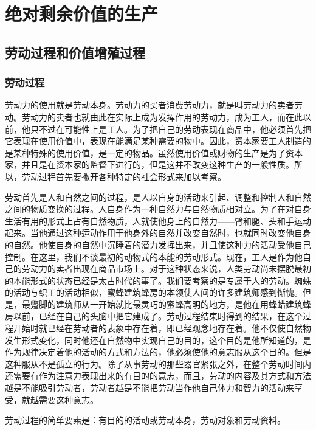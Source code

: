 \documentclass{ctexbook}
\begin{document}
\part{绝对剩余价值的生产}

\chapter{劳动过程和价值增殖过程}

    \section{劳动过程}

    
    劳动力的使用就是劳动本身。劳动力的买者消费劳动力，就是叫劳动力的卖者劳动。劳动力的卖者也就由此在实际上成为发挥作用的劳动力，成为工人，而在此以前，他只不过在可能性上是工人。为了把自己的劳动表现在商品中，他必须首先把它表现在使用价值中，表现在能满足某种需要的物中。因此，资本家要工人制造的是某种特殊的使用价值，是一定的物品。虽然使用价值或财物的生产是为了资本家，并且是在资本家的监督下进行的，但是这并不改变这种生产的一般性质。所以，劳动过程首先要撇开各种特定的社会形式来加以考察。

    劳动首先是人和自然之间的过程，是人以自身的活动来引起、调整和控制人和自然之间的物质变换的过程。人自身作为一种自然力与自然物质相对立。为了在对自身生活有用的形式上占有自然物质，人就使他身上的自然力——臂和腿、头和手运动起来。当他通过这种运动作用于他身外的自然并改变自然时，也就同时改变他自身的自然。他使自身的自然中沉睡着的潜力发挥出来，并且使这种力的活动受他自己控制。在这里，我们不谈最初的动物式的本能的劳动形式。现在，工人是作为他自己的劳动力的卖者出现在商品市场上。对于这种状态来说，人类劳动尚未摆脱最初的本能形式的状态已经是太古时代的事了。我们要考察的是专属于人的劳动。蜘蛛的活动与织工的活动相似，蜜蜂建筑蜂房的本领使人间的许多建筑师感到惭愧。但是，最蹩脚的建筑师从一开始就比最灵巧的蜜蜂高明的地方，是他在用蜂蜡建筑蜂房以前，已经在自己的头脑中把它建成了。劳动过程结束时得到的结果，在这个过程开始时就已经在劳动者的表象中存在着，即已经观念地存在着。他不仅使自然物发生形式变化，同时他还在自然物中实现自己的目的，这个目的是他所知道的，是作为规律决定着他的活动的方式和方法的，他必须使他的意志服从这个目的。但是这种服从不是孤立的行为。除了从事劳动的那些器官紧张之外，在整个劳动时间内还需要有作为注意力表现出来的有目的的意志，而且，劳动的内容及其方式和方法越是不能吸引劳动者，劳动者越是不能把劳动当作他自己体力和智力的活动来享受，就越需要这种意志。

    劳动过程的简单要素是：有目的的活动或劳动本身，劳动对象和劳动资料。
\end{document}
